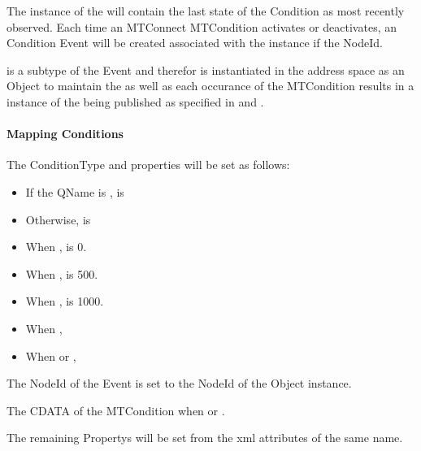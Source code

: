 The instance of the  will contain the last state of the \gls{Condition} as most recently observed. Each time an MTConnect \gls{MTCondition} activates or deactivates, an \gls{Condition} \gls{Event} will be created associated with the instance if the  \gls{NodeId}. 

 is a subtype of the \gls{Event} and therefor is instantiated in the address space as an \gls{Object} to maintain the  as well as each occurance of the \gls{MTCondition} results in a instance of the  being published as specified in \cite{UAPart3} and \cite{UAPart9}.

\paragraph{Mapping Conditions}

The \gls{ConditionType} and  properties will be set as follows:

\begin{description}[font=\it\bfseries,labelindent=4em,labelwidth=6em,leftmargin=!]    
  \item[EnableState]
  \begin{itemize}
    \item If the \gls{QName} is ,  is 
    \item Otherwise,  is 
  \end{itemize}
  \vspace{1em}
  \item[Severity]
  \begin{itemize}
    \item When ,  is 0.
    \item When ,  is 500.
    \item When ,  is 1000.
  \end{itemize}
  \vspace{1em}
  \item[Retain]
  \begin{itemize}
    \item When , 
    \item When  or , 
  \end{itemize}
  \vspace{1em}
  \item[Time] 
  \item[NodeId] The \gls{NodeId} of the \gls{Event} is set to the \gls{NodeId} of the  \gls{Object} instance.
  \item[Message] The \gls{CDATA} of the \gls{MTCondition} when  or .
  \item[\ldots] The remaining \glspl{Property} will be set from the \gls{xml} attributes of the same name.
\end{description}

